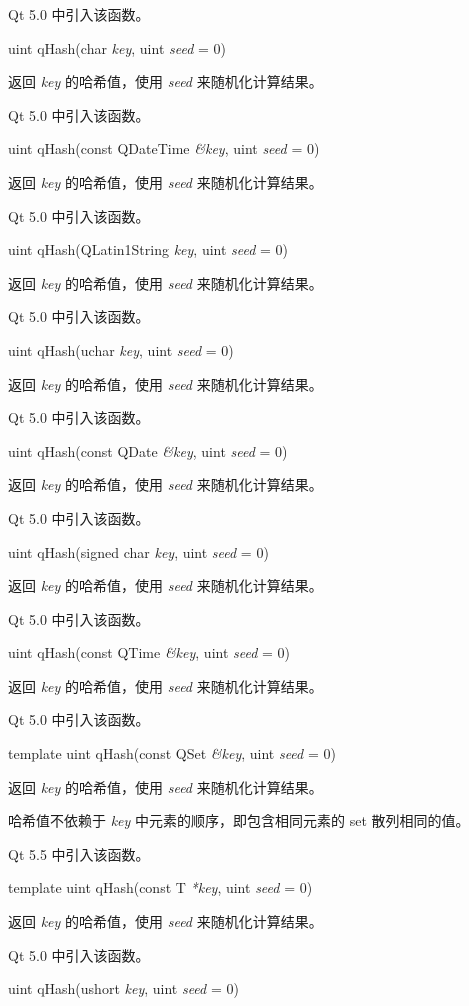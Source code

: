 Qt 5.0 中引入该函数。

uint qHash(char \emph{key}, uint \emph{seed} = 0)

返回 \emph{key} 的哈希值，使用 \emph{seed} 来随机化计算结果。

Qt 5.0 中引入该函数。

uint qHash(const QDateTime \emph{\&key}, uint \emph{seed} = 0)

返回 \emph{key} 的哈希值，使用 \emph{seed} 来随机化计算结果。

Qt 5.0 中引入该函数。

uint qHash(QLatin1String \emph{key}, uint \emph{seed} = 0)

返回 \emph{key} 的哈希值，使用 \emph{seed} 来随机化计算结果。

Qt 5.0 中引入该函数。

uint qHash(uchar \emph{key}, uint \emph{seed} = 0)

返回 \emph{key} 的哈希值，使用 \emph{seed} 来随机化计算结果。

Qt 5.0 中引入该函数。

uint qHash(const QDate \emph{\&key}, uint \emph{seed} = 0)

返回 \emph{key} 的哈希值，使用 \emph{seed} 来随机化计算结果。

Qt 5.0 中引入该函数。

uint qHash(signed char \emph{key}, uint \emph{seed} = 0)

返回 \emph{key} 的哈希值，使用 \emph{seed} 来随机化计算结果。

Qt 5.0 中引入该函数。

uint qHash(const QTime \emph{\&key}, uint \emph{seed} = 0)

返回 \emph{key} 的哈希值，使用 \emph{seed} 来随机化计算结果。

Qt 5.0 中引入该函数。

template uint qHash(const QSet \emph{\&key}, uint \emph{seed} = 0)

返回 \emph{key} 的哈希值，使用 \emph{seed} 来随机化计算结果。

哈希值不依赖于 \emph{key} 中元素的顺序，即包含相同元素的 set 散列相同的值。

Qt 5.5 中引入该函数。

template uint qHash(const T \emph{*key}, uint \emph{seed} = 0)

返回 \emph{key} 的哈希值，使用 \emph{seed} 来随机化计算结果。

Qt 5.0 中引入该函数。

uint qHash(ushort \emph{key}, uint \emph{seed} = 0)

